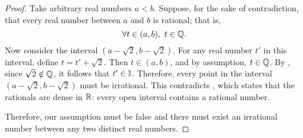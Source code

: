 \begin{proof}
    Take arbitrary real numbers $a < b$. Suppose, for the sake of contradiction, that every real number between $a$ and $b$ 
    is rational; that is,
    \[
    \forall t \in (a, b),\ t \in \mathbb{Q}.
    \]
    Now consider the interval $(a - \sqrt{2}, b - \sqrt{2})$. For any real number $t'$ in this interval, define 
    $t = t' + \sqrt{2}$. Then $t \in (a, b)$, and by assumption, $t \in \mathbb{Q}$. By , 
    since $\sqrt{2} \notin \mathbb{Q}$, it follows that $t' \in \mathbb{I}$. Therefore, every point in the interval $(a - \sqrt{2}, b - \sqrt{2})$ 
    must be irrational. This contradicts , which states that the rationals are dense 
    in $\mathbb{R}$: every open interval contains a rational number.

    Therefore, our assumption must be false and there must exist an irrational number between any two distinct real numbers.

\end{proof}
